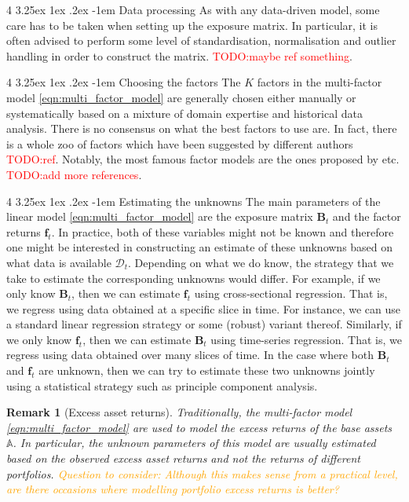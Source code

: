 \documentclass[12pt]{article}
\makeatletter
\newtheorem{remark}{Remark}[section]
\renewcommand\paragraph{%
	\@startsection{paragraph}
	{4}
	{\z@}
	{3.25ex \@plus1ex \@minus.2ex}
	{-1em}
	{\normalfont\normalsize\bfseries\maybe@addperiod}%
}
\newcommand{\maybe@addperiod}[1]{%
	#1\@addpunct{.}%
}
\makeatother
\begin{document}
\paragraph{Data processing} As with any data-driven model, some care has to be taken when setting up the exposure matrix. In particular, it is often advised to perform some level of standardisation, normalisation and outlier handling in order to construct the matrix. \textcolor{red}{TODO:maybe ref something}.

\paragraph{Choosing the factors} The $K$ factors in the multi-factor model \eqref{eqn:multi_factor_model} are generally chosen either manually or systematically based on a mixture of domain expertise and historical data analysis. There is no consensus on what the best factors to use are. In fact, there is a whole zoo of factors which have been suggested by different authors \textcolor{red}{TODO:ref}. Notably, the most famous factor models are the ones proposed by \cite{fama1993jofe} etc. \textcolor{red}{TODO:add more references}.

\paragraph{Estimating the unknowns} The main parameters of the linear model \eqref{eqn:multi_factor_model} are the exposure matrix $\mathbf{B}_t$ and the factor returns $\mathbf{f}_t$. In practice, both of these variables might not be known and therefore one might be interested in constructing an estimate of these unknowns based on what data is available $\mathcal{D}_t$. Depending on what we do know, the strategy that we take to estimate the corresponding unknowns would differ. For example, if we only know $\mathbf{B}_t$, then we can estimate $\mathbf{f}_t$ using cross-sectional regression. That is, we regress using data obtained at a specific slice in time. For instance, we can use a standard linear regression strategy or some (robust) variant thereof. Similarly, if we only know $\mathbf{f}_t$, then we can estimate $\mathbf{B}_t$ using time-series regression. That is, we regress using data obtained over many slices of time. In the case where both $\mathbf{B}_t$ and $\mathbf{f}_t$ are unknown, then we can try to estimate these two unknowns jointly using a statistical strategy such as principle component analysis.

\begin{remark}
	[Excess asset returns] Traditionally, the multi-factor model \eqref{eqn:multi_factor_model} are used to model the excess returns of the base assets $\mathbb{A}$. In particular, the unknown parameters of this model are usually estimated based on the observed excess asset returns and not the returns of different portfolios. \textcolor{orange}{Question to consider: Although this makes sense from a practical level, are there occasions where modelling portfolio excess returns is better?}
\end{remark}
\end{document}
